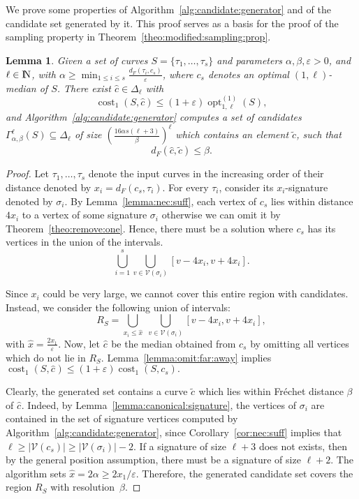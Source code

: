 \documentclass[11pt, letter]{article}
\DeclareMathOperator{\cost}{cost}
\DeclareMathOperator{\opt}{opt}
\newtheorem{lemma}[theorem]{Lemma}
\newcommand{\thmref}[1]{Theorem~\ref{theo:#1}}
\newcommand{\lemlab}[1]{\label{lemma:#1}}
\newcommand{\lemref}[1]{Lemma~\ref{lemma:#1}}
\newcommand{\algref}[1]{Algorithm~\ref{alg:#1}}
\newcommand{\corref}[1]{Corollary~\ref{cor:#1}}
\newcommand{\Frechet}{Fr\'echet\xspace}
\providecommand{\eps}{{\varepsilon}}\newcommand{\Astop}{\overline{a}}
\providecommand{\pth}[2][\!]{#1\left({#2}\right)}
\newcommand{\Na}{{\rm I\!\hspace{-0.025em} N}}
\newcommand{\lenClusters}{\ensuremath{\ell}}
\newcommand{\trajectory}[2]{\ensuremath{{#1}_{#2}}}
\newcommand{\inputSym}{\ensuremath{\tau}}
\newcommand{\centerSym}{\ensuremath{c}}
\newcommand{\inputTraj}[1]{\trajectory{\inputSym}{#1}}
\newcommand{\centerTraj}[1]{\trajectory{\centerSym}{#1}}
\newcommand{\VtxSet}{\ensuremath{\mathcal{V}}}
\newcommand{\distFr}[2]{\ensuremath{d_F\pth{#1,#2}}}
\begin{document}
We prove some properties of \algref{candidate:generator} and of the candidate
set generated by it. This proof serves as a basis for the proof of the sampling
property in \thmref{modified:sampling:prop}. 


\begin{lemma}\lemlab{candidate:generator}
Given a set of curves $S=\{\inputTraj{1},\dots,\inputTraj{s}\} $ and parameters
$\alpha,\beta,\eps > 0$, and $\lenClusters \in \Na$, with 
$\alpha \geq \min_{1\leq i\leq s} \frac{ \distFr{\inputTraj{i}}{c_s} }{\eps}$, where $c_s$ denotes an optimal $(1,\lenClusters)$-median of $S$. 
There exist $\widehat{c} \in \Delta_{\lenClusters}$ with
\[ \cost_{1}(S,\widehat{c}) \leq (1+\eps)\opt^{(1)}_{1,\lenClusters}(S),\] 
and 
\algref{candidate:generator} computes a set of candidates $\Gamma^{\lenClusters}_{\alpha,\beta}(S) \subseteq \Delta_\ell$
of size  $\left({\frac{16\alpha s(\lenClusters+3)}{\beta}}\right)^{\lenClusters}$
which contains an element $\tilde{c}$, such that 
\[\distFr{\widehat{c}}{\tilde{c}}\leq \beta.\]
\end{lemma}

\begin{proof}
Let $\inputTraj{1},\dots,\inputTraj{s}$ denote the input curves in the increasing order of their
distance denoted by $x_i=\distFr{\centerTraj{s}}{\inputTraj{i}}$. For every $\inputTraj{i}$,
consider its $x_i$-signature denoted by $\sigma_i$.   
By \lemref{nec:suff}, each vertex of
$\centerTraj{s}$ lies within distance $4x_i$ to a vertex of some signature
$\sigma_i$ otherwise we can omit it by \thmref{remove:one}.  Hence, there must be a solution where
$\centerTraj{s}$ has its vertices in the union of the intervals. 
\[ \bigcup_{i=1}^s \bigcup_{v \in \VtxSet(\sigma_i) }  [v-4x_i,v+4x_i].\] 

Since $x_i$ could be very large, we cannot cover this entire region with candidates. 
Instead, we consider the following union of intervals: 
\[ R_S = \bigcup_{ x_i
\leq \widehat{x}}\; \bigcup_{v \in \VtxSet(\sigma_i) } [v-4x_i,v+4x_i],\]
with $\widehat{x}=\frac{2x_1}{\eps}$.
Now, let $\widehat{\centerTraj{}}$ be the median obtained from $\centerTraj{s}$ by
omitting all vertices which do not lie in $R_S$. 
\lemref{omit:far:away} implies $\cost_{1}(S,\widehat{\centerTraj{}}) \leq (1+\eps)  \cost_{1}(S,\centerTraj{s}).$

Clearly, the generated set contains a curve $\tilde{\centerTraj{}}$
which lies within \Frechet distance $\beta$ of $\widehat{\centerTraj{}}$. 
Indeed, by \lemref{canonical:signature}, the vertices of $\sigma_i$ are contained in
the set of signature vertices computed by \algref{candidate:generator}, since 
\corref{nec:suff} implies that 
$\ell \geq |\VtxSet\pth{\centerTraj{s}}| \geq |\VtxSet\pth{\sigma_i}|-2$.  
If a signature of size $\ell+3$ does not
exists, then by the general position assumption, there must be a signature of
size $\ell+2$.
The algorithm sets $\widehat{x}= 2\alpha \geq 2 x_1/\eps$. 
Therefore, the generated candidate set covers the region $R_S$ with resolution~$\beta$.
\end{proof}
\end{document}
